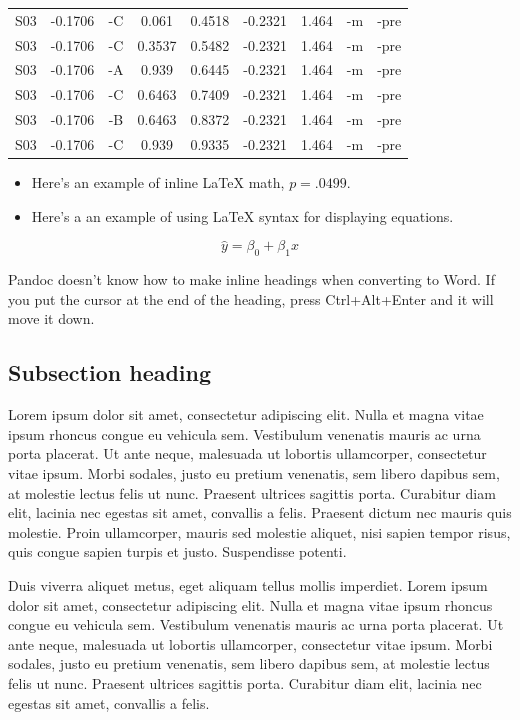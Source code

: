 \documentclass[\pandocDocMode,longtable,noextraspace,floatsintext]{apa6}
\begin{document}
\begin{longtable}[]{@{}ccccccccc@{}}
S03 & -0.1706 & -C & 0.061 & 0.4518 & -0.2321 & 1.464 & -m & -pre \\
S03 & -0.1706 & -C & 0.3537 & 0.5482 & -0.2321 & 1.464 & -m & -pre \\
S03 & -0.1706 & -A & 0.939 & 0.6445 & -0.2321 & 1.464 & -m & -pre \\
S03 & -0.1706 & -C & 0.6463 & 0.7409 & -0.2321 & 1.464 & -m & -pre \\
S03 & -0.1706 & -B & 0.6463 & 0.8372 & -0.2321 & 1.464 & -m & -pre \\
S03 & -0.1706 & -C & 0.939 & 0.9335 & -0.2321 & 1.464 & -m & -pre \\
\bottomrule()
\end{longtable}

\begin{itemize}
\item
  Here's an example of inline LaTeX math, \(p=.0499\).
\item
  Here's a an example of using LaTeX syntax for displaying equations.
\end{itemize}

\[
\hat{y} = \beta_0 + \beta_1 x
\]

Pandoc doesn't know how to make inline headings when converting to Word.
If you put the cursor at the end of the heading, press Ctrl+Alt+Enter
and it will move it down.

\hypertarget{subsection-heading}{%
\subsection{Subsection heading}\label{subsection-heading}}

Lorem ipsum dolor sit amet, consectetur adipiscing elit. Nulla et magna
vitae ipsum rhoncus congue eu vehicula sem. Vestibulum venenatis mauris
ac urna porta placerat. Ut ante neque, malesuada ut lobortis
ullamcorper, consectetur vitae ipsum. Morbi sodales, justo eu pretium
venenatis, sem libero dapibus sem, at molestie lectus felis ut nunc.
Praesent ultrices sagittis porta. Curabitur diam elit, lacinia nec
egestas sit amet, convallis a felis. Praesent dictum nec mauris quis
molestie. Proin ullamcorper, mauris sed molestie aliquet, nisi sapien
tempor risus, quis congue sapien turpis et justo. Suspendisse potenti.

Duis viverra aliquet metus, eget aliquam tellus mollis imperdiet. Lorem
ipsum dolor sit amet, consectetur adipiscing elit. Nulla et magna vitae
ipsum rhoncus congue eu vehicula sem. Vestibulum venenatis mauris ac
urna porta placerat. Ut ante neque, malesuada ut lobortis ullamcorper,
consectetur vitae ipsum. Morbi sodales, justo eu pretium venenatis, sem
libero dapibus sem, at molestie lectus felis ut nunc. Praesent ultrices
sagittis porta. Curabitur diam elit, lacinia nec egestas sit amet,
convallis a felis.
\end{document}
